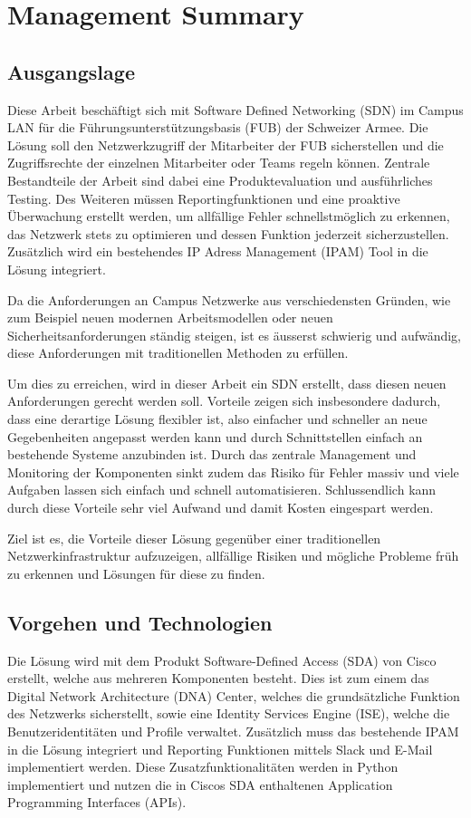 \section{Management Summary}

\subsection{Ausgangslage}
Diese Arbeit beschäftigt sich mit Software Defined Networking (SDN) im Campus LAN für die Führungsunterstützungsbasis (FUB) der Schweizer Armee. Die Lösung soll den Netzwerkzugriff der Mitarbeiter der FUB sicherstellen und die Zugriffsrechte der einzelnen Mitarbeiter oder Teams regeln können. Zentrale Bestandteile der Arbeit sind dabei eine Produktevaluation und ausführliches Testing. 
Des Weiteren müssen Reportingfunktionen und eine proaktive Überwachung erstellt werden, um allfällige Fehler schnellstmöglich zu erkennen, das Netzwerk stets zu optimieren und dessen Funktion jederzeit sicherzustellen.
Zusätzlich wird ein bestehendes IP Adress Management (IPAM) Tool in die Lösung integriert.

Da die Anforderungen an Campus Netzwerke aus verschiedensten Gründen, wie zum Beispiel neuen modernen Arbeitsmodellen oder neuen Sicherheitsanforderungen ständig steigen, ist es äusserst schwierig und aufwändig, diese Anforderungen mit traditionellen Methoden zu erfüllen. 

Um dies zu erreichen, wird in dieser Arbeit ein SDN erstellt, dass diesen neuen Anforderungen gerecht werden soll. Vorteile zeigen sich insbesondere dadurch, dass eine derartige Lösung flexibler ist, also einfacher und schneller an neue Gegebenheiten angepasst werden kann und durch Schnittstellen einfach an bestehende Systeme anzubinden ist. Durch das zentrale Management und Monitoring der Komponenten sinkt zudem das Risiko für Fehler massiv und viele Aufgaben lassen sich einfach und schnell automatisieren.
Schlussendlich kann durch diese Vorteile sehr viel Aufwand und damit Kosten eingespart werden.

Ziel ist es, die Vorteile dieser Lösung gegenüber einer traditionellen Netzwerkinfrastruktur aufzuzeigen, allfällige Risiken und mögliche Probleme früh zu erkennen und Lösungen für diese zu finden. 
\subsection{Vorgehen und Technologien}
Die Lösung wird mit dem Produkt Software-Defined Access (SDA) von Cisco erstellt, welche aus mehreren Komponenten besteht. Dies ist zum einem das Digital Network Architecture (DNA) Center, welches die grundsätzliche Funktion des Netzwerks sicherstellt, sowie eine Identity Services Engine (ISE), welche die Benutzeridentitäten und Profile verwaltet.
Zusätzlich muss das bestehende IPAM in die Lösung integriert und Reporting Funktionen mittels Slack und E-Mail implementiert werden. Diese Zusatzfunktionalitäten werden in Python implementiert und nutzen die in Ciscos SDA enthaltenen Application Programming Interfaces (APIs).
